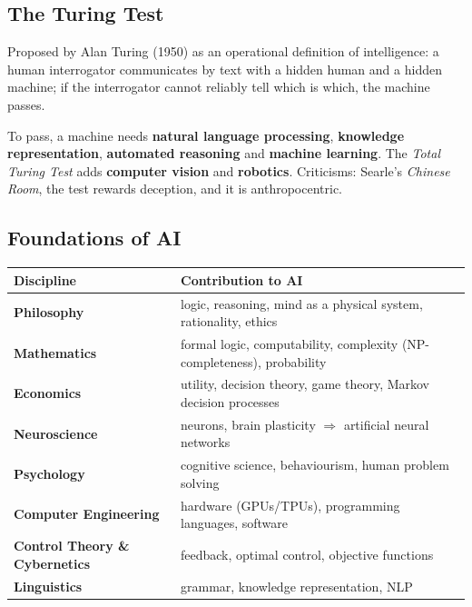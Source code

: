 \subsection{The Turing Test}
Proposed by Alan Turing (1950) as an operational definition of intelligence: a human interrogator communicates by text with a hidden human and a hidden machine; if the interrogator cannot reliably tell which is which, the machine passes.
\begin{center}
\end{center}
To pass, a machine needs \textbf{natural language processing}, \textbf{knowledge representation}, \textbf{automated reasoning} and \textbf{machine learning}. The \emph{Total Turing Test} adds \textbf{computer vision} and \textbf{robotics}. Criticisms: Searle's \emph{Chinese Room}, the test rewards deception, and it is anthropocentric.

\subsection{Foundations of AI}
\begin{tabularx}{\linewidth}{>{\leavevmode\bfseries\color{navy}}l X}
\toprule
Discipline & Contribution to AI\\\midrule
Philosophy & logic, reasoning, mind as a physical system, rationality, ethics\\
Mathematics & formal logic, computability, complexity (NP-completeness), probability\\
Economics & utility, decision theory, game theory, Markov decision processes\\
Neuroscience & neurons, brain plasticity $\Rightarrow$ artificial neural networks\\
Psychology & cognitive science, behaviourism, human problem solving\\
Computer Engineering & hardware (GPUs/TPUs), programming languages, software\\
Control Theory \& Cybernetics & feedback, optimal control, objective functions\\
Linguistics & grammar, knowledge representation, NLP\\\bottomrule
\end{tabularx}

